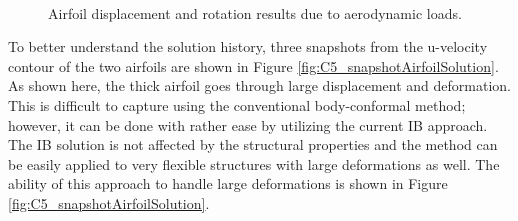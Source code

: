 %
\begin{figure}[H]
    \centering
    \quad
    \\
    \quad
    \caption{Airfoil displacement and rotation results due to aerodynamic loads.}
    \label{fig:C5_airfoilDisplacementRotation}
\end{figure}
%
To better understand the solution history, three snapshots from the u-velocity contour of the two airfoils are shown in Figure \ref{fig:C5_snapshotAirfoilSolution}. As shown here, the thick airfoil goes through large displacement and deformation. This is difficult to capture using the conventional body-conformal method; however, it can be done with rather ease by utilizing the current IB approach. The IB solution is not affected by the structural properties and the method can be easily applied to very flexible structures with large deformations as well. The ability of this approach to handle large deformations is shown in Figure \ref{fig:C5_snapshotAirfoilSolution}.
